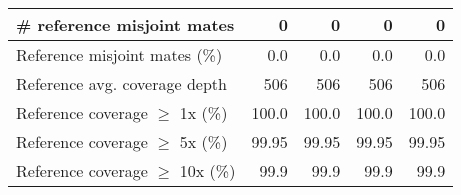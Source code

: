 \documentclass[12pt,a4paper]{article}
\begin{document}
\begin{table}[ht]
\begin{center}
\begin{tabular}{|l*{4}{|r}|}
\# reference misjoint mates & 0 & 0 & 0 & 0 \\ \hline
Reference misjoint mates (\%) & 0.0 & 0.0 & 0.0 & 0.0 \\ \hline
Reference avg. coverage depth & 506 & 506 & 506 & 506 \\ \hline
Reference coverage $\geq$ 1x (\%) & 100.0 & 100.0 & 100.0 & 100.0 \\ \hline
Reference coverage $\geq$ 5x (\%) & 99.95 & 99.95 & 99.95 & 99.95 \\ \hline
Reference coverage $\geq$ 10x (\%) & 99.9 & 99.9 & 99.9 & 99.9 \\ \hline
\end{tabular}
\end{center}
\end{table}
\end{document}
